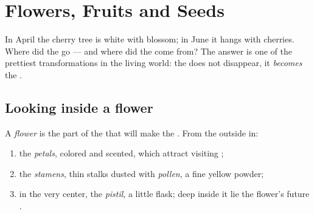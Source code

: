 \chapter{Flowers, Fruits and Seeds}\label{ch:g3:flowers-fruits-seeds}

In April the cherry tree is white with blossom; in June it hangs
with cherries. Where did the  go --- and where did the
 come from? The answer is one of the prettiest
transformations in the living world: the  does not
disappear, it \emph{becomes} the .

\section{Looking inside a flower}

\begin{definition}\label{def:g3:flowers-fruits-seeds:parts}
A \emph{flower} is the part of the  that will
make the . From the outside in:
\begin{enumerate}
  \item the \emph{petals}, colored and scented, which
        attract visiting ;
  \item the \emph{stamens}, thin stalks dusted with
        \emph{pollen}, a fine yellow powder;
  \item in the very center, the \emph{pistil}, a
        little flask; deep inside it lie the flower's future
        .
\end{enumerate}
\end{definition}

